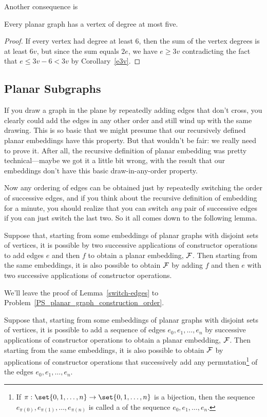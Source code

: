 Another consequence is
\begin{lemma}\label{d5}
Every planar graph has a vertex of degree at most five.
\end{lemma}

\begin{proof}
  If every vertex had degree at least 6, then the sum of the vertex
  degrees is at least $6v$, but since the sum equals $2e$, we have $e \geq
  3v$ contradicting the fact that $e \leq 3v-6 < 3v$ by
  Corollary~\ref{e3v}.
\end{proof}

\subsection{Planar Subgraphs}

If you draw a graph in the plane by repeatedly adding edges that don't
cross, you clearly could add the edges in any other order and still
wind up with the same drawing.  This is so basic that we might presume
that our recursively defined planar embeddings have this property.
But that wouldn't be fair: we really need to prove it.  After all, the
recursive definition of planar embedding was pretty technical---maybe
we got it a little bit wrong, with the result that our embeddings
don't have this basic draw-in-any-order property.

Now any ordering of edges can be obtained just by repeatedly switching the
order of successive edges, and if you think about the recursive definition
of embedding for a minute, you should realize that you can switch
\emph{any} pair of successive edges if you can just switch the last two.
So it all comes down to the following lemma.

\begin{lemma}\label{switch-edges} Suppose that,
  starting from some embeddings of planar graphs with disjoint sets of
  vertices, it is possible by two successive applications of constructor
  operations to add edges $e$ and then $f$ to obtain a planar embedding,
  $\mathcal{F}$.  Then starting from the same embeddings, it is also
  possible to obtain $\mathcal{F}$ by adding $f$ and then $e$ with two
  successive applications of constructor operations.
\end{lemma}

We'll leave the proof of Lemma~\ref{switch-edges} to
Problem~\ref{PS_planar_graph_construction_order}.

\begin{corollary}\label{permute-edges} Suppose that, starting from some
  embeddings of planar graphs with disjoint sets of vertices, it is
  possible to add a sequence of edges $e_0,e_1,\dots,e_n$ by successive
  applications of constructor operations to obtain a planar embedding,
  $\mathcal{F}$.  Then starting from the same embeddings, it is also
  possible to obtain $\mathcal{F}$ by applications of constructor operations
  that successively add any permutation\footnote{If $\pi:\set{0,1,\dots,n} \to
    \set{0,1,\dots,n}$ is a bijection, then the sequence
    $e_{\pi(0)},e_{\pi(1)},\dots,e_{\pi(n)}$ is called a  of
    the sequence $e_0,e_1,\dots,e_n$.} of the edges $e_0,e_1,\dots,e_n$.
\end{corollary}

